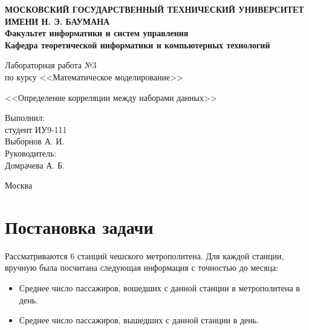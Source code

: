 \documentclass[12pt,a4paper,oneside]{extarticle}
\begin{document}
\pgfplotsset{compat=1.8}

\thispagestyle{empty}
\newpage
{
\centering


\textbf{
МОСКОВСКИЙ ГОСУДАРСТВЕННЫЙ ТЕХНИЧЕСКИЙ УНИВЕРСИТЕТ ИМЕНИ Н. Э. БАУМАНА \\
Факультет информатики и систем управления \\
Кафедра теоретической информатики и компьютерных технологий}
\bigskip
\bigskip
\bigskip
\bigskip
\bigskip
\bigskip
\bigskip

\vfill


Лабораторная работа №3 \\
по курсу <<Математическое моделирование>>

\bigskip

{\large <<Определение корреляции между наборами данных>>}
\bigskip

\vfill



\hfill\parbox{4cm} {
Выполнил:\\
студент ИУ9-111 \hfill \\
Выборнов А. И.\hfill \medskip\\
Руководитель:\\
Домрачева А. Б.\hfill
}


\vspace{\fill}

Москва \number\year
\clearpage
}



\clearpage


\section{Постановка задачи}
    Рассматриваются 6 станций чешского метрополитена. Для каждой станции, вручную была посчитана следующая информация с точностью до месяца:
    \begin{itemize}
        \item Среднее число пассажиров, вошедших с данной станции в метрополитена в день.
        \item Среднее число пассажиров, вышедших с данной станции в день.
    \end{itemize}
\end{document}
